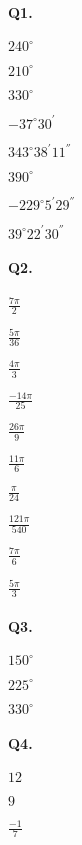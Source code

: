 \documentclass{article}
\begin{document}
\paragraph{Q1.}
\begin{enumerate*}[label=\alph*)]
          \item $240^{\circ}$
          \item $210^{\circ}$
          \item $330^{\circ}$
          \item $-37^{\circ}30^{'}$
          \item $343^{\circ}38^{'}11^{''}$
          \item $390^{\circ}$
          \item $-229^{\circ}5^{'}29^{''}$
          \item $39^{\circ}22^{'}30^{''}$
\end{enumerate*}

\paragraph{Q2.}
\begin{enumerate*}[label=\alph*)]
          \item $\frac{7\pi}{2}$
          \item $\frac{5\pi}{36}$
          \item $\frac{4\pi}{3}$
          \item $\frac{-14\pi}{25}$
          \item $\frac{26\pi}{9}$
          \item $\frac{11\pi}{6}$
          \item $\frac{\pi}{24}$
          \item $\frac{121\pi}{540}$
          \item $\frac{7\pi}{6}$
          \item $\frac{5\pi}{3}$
\end{enumerate*}

\paragraph{Q3.}
\begin{enumerate*}[label=\alph*)]
          \item $150^{\circ}$
          \item $225^{\circ}$
          \item $330^{\circ}$
\end{enumerate*}

\paragraph{Q4.}
\begin{enumerate*}[label=\alph*)]
          \item $12$
          \item $9$
          \item $\frac{-1}{7}$
\end{enumerate*}
\end{document}
